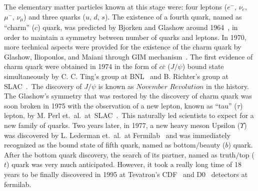 The elementary matter particles known at this stage were: four leptons ($e^{-}$, $\nu_{e}$, $\mu^{-}$, $\nu_{\mu}$) and three quarks ($u$, $d$, $s$).
The existence of a fourth quark, named as ``charm'' ($c$) quark, was predicted by Bjorken and Glashow around 1964~\cite{Bjorken:1964gz},
in order to maintain a symmetry between number of
quarks and leptons. In 1970, more technical aspects were provided for the existence of the charm quark by Glashow, Iliopoulos, and Maiani through GIM
mechanism~\cite{Glashow:1970gm}.
The first evidence of charm quark were obtained in 1974 in the form of $c\bar{c}$ ($J/\psi$) bound state simultaneously by C. C. Ting's
group at BNL~\cite{Aubert:1974js} and
B. Richter's group at SLAC~\cite{Augustin:1974xw}.\ The discovery of $J/\psi$ is known as $\textit{November Revolution}$ in the history.
The Glashow's symmetry that was restored
by the discovery of charm quark was soon broken in 1975 with the observation of a new lepton, known as ``tau'' ($\tau$) lepton,
by M. Perl et.\ al.\ at\ SLAC~\cite{Perl:1975bf}.\
This naturally led scientists to expect for a new family of quarks. Two years later, in 1977, a new heavy meson Upsilon ($\Upsilon$) was discovered by
L. Lederman et.\ al.\ at Fermilab~\cite{Herb:1977ek} and was immediately recognized as the bound state of fifth quark, named as bottom$/$beauty
($b$) quark. After the bottom
quark discovery, the search of its partner, named as truth$/$top ($t$) quark was very much anticipated. However, it took a really long time of 18 years to be finally
discovered in 1995 at Tevatron's CDF~\cite{Abe:1995hr} and D0~\cite{Abachi:1995iq} detectors at fermilab. 

